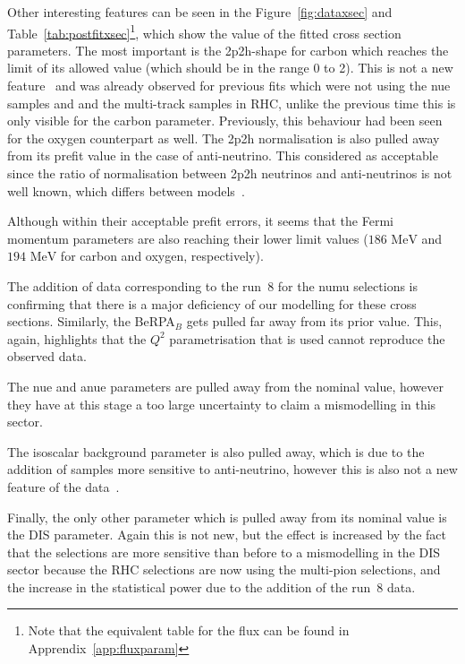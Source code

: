 Other interesting features can be seen in the
Figure~\ref{fig:dataxsec} and
Table~\ref{tab:postfitxsec}\footnote{Note that the equivalent table
  for the flux can be found in Apprendix~\ref{app:fluxparam}}, which
show the value of the fitted cross section parameters. The most
important is the \Gls{2p2h}-shape for carbon which reaches the limit
of its allowed value (which should be in the range 0 to 2). This is
not a new feature~\cite{TN324} and was already observed for previous
fits which were not using the \Gls{nue} samples and and the
multi-track samples in \Gls{RHC}, unlike the previous time this is
only visible for the carbon parameter. Previously, this behaviour had
been seen for the oxygen counterpart as well. The \Gls{2p2h}
normalisation is also pulled away from its prefit value in the case of
anti-neutrino. This considered as acceptable since the ratio of
normalisation between \Gls{2p2h} neutrinos and anti-neutrinos is not
well known, which differs between
models~\cite{MartiniNpNh1,MartiniNpNh2,NievesNpNh1,NievesNpNh2}.

Although within their acceptable prefit errors, it seems that the
Fermi momentum parameters are also reaching their lower limit values
($186\text{~MeV}$ and $194\text{~MeV}$ for carbon and oxygen,
respectively).

The addition of data corresponding to the run~8 for the \Gls{numu}
selections is confirming that there is a major deficiency of our
modelling for these cross sections. Similarly, the BeRPA$_B$ gets
pulled far away from its prior value. This, again, highlights that the
$Q^2$ parametrisation that is used cannot reproduce the observed data.

The \Gls{nue} and \Gls{anue} parameters are pulled away from the
nominal value, however they have at this stage a too large uncertainty
to claim a mismodelling in this sector.

The isoscalar background parameter is also pulled away, which is due
to the addition of samples more sensitive to anti-neutrino, however
this is also not a new feature of the data~\cite{TN324}.

Finally, the only other parameter which is pulled away from its
nominal value is the \Gls{DIS} parameter. Again this is not new, but
the effect is increased by the fact that the selections are more
sensitive than before to a mismodelling in the \Gls{DIS} sector
because the \Gls{RHC} selections are now using the multi-pion
selections, and the increase in the statistical power due to the
addition of the run~8 data.


